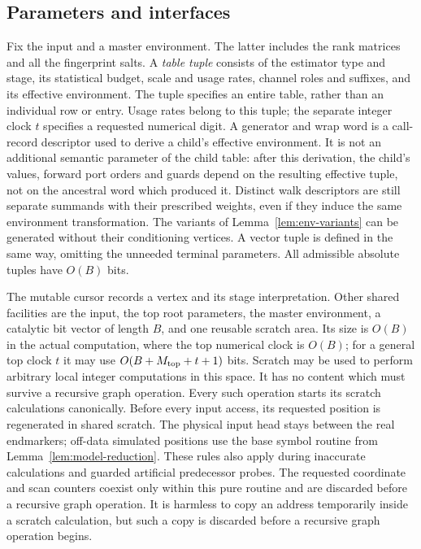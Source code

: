 \subsection{Parameters and interfaces}\label{sec:ctrl-model}

Fix the input and a master environment.  The latter includes the rank
matrices and all the fingerprint salts.  A \emph{table tuple} consists of
the estimator type and stage, its statistical budget, scale and usage
rates, channel roles and suffixes, and its effective environment.  The
tuple specifies an entire table, rather than an individual row or entry.
Usage rates belong to this tuple; the separate integer clock $t$
specifies a requested numerical digit.
A generator and wrap word is a call-record descriptor used to derive a
child's effective environment.  It is not an additional semantic
parameter of the child table: after this derivation, the child's values,
forward port orders and guards depend on the resulting effective tuple,
not on the ancestral word which produced it.  Distinct walk descriptors
are still separate summands with their prescribed weights, even if they
induce the same environment transformation.  The variants of
Lemma~\ref{lem:env-variants} can be generated without their conditioning
vertices.  A vector tuple is defined in the same way, omitting the
unneeded terminal parameters.  All admissible absolute tuples have
$O(B)$ bits.

The mutable cursor records a vertex and its stage interpretation.  Other shared facilities are the input, the top root parameters, the master
environment, a catalytic bit vector of length $B$, and one reusable
scratch area.  Its size is $O(B)$ in the actual computation, where the
top numerical clock is $O(B)$; for a general top clock $t$ it may use
$O(B+M_{\rm top}+t+1)$ bits.  Scratch may be used to perform arbitrary local integer
computations in this space.  It has no content which must survive a
recursive graph operation.  Every such operation starts its scratch
calculations canonically. Before every input access, its requested
position is regenerated in shared scratch. The physical
input head stays between the real endmarkers; off-data simulated
positions use the base symbol routine from
Lemma~\ref{lem:model-reduction}. These rules also apply during inaccurate
calculations and guarded artificial predecessor probes. The requested
coordinate and scan counters coexist only within this pure routine and
are discarded before a recursive graph operation. It is harmless to
copy an address temporarily
inside a scratch calculation, but such a copy is discarded before a
recursive graph operation begins.

